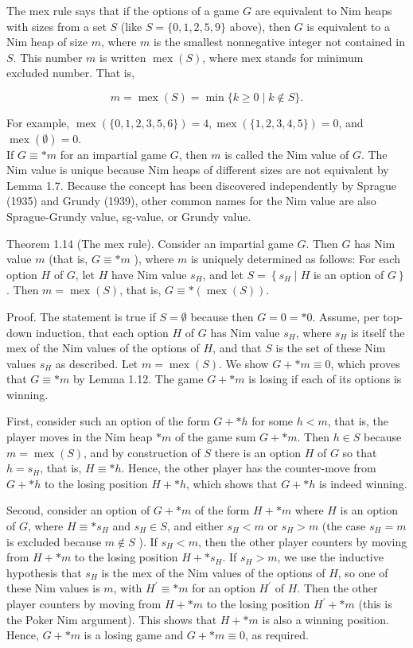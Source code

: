 \documentclass[12pt]{article}
\begin{document}
The mex rule says that if the options of a game $G$ are equivalent to Nim heaps with sizes from a set $S$ (like $S=\{0,1,2,5,9\}$ above), then $G$ is equivalent to a Nim heap of size $m$, where $m$ is the smallest nonnegative integer not contained in $S$. This number $m$ is written $\operatorname{mex}(S)$, where mex stands for minimum excluded number. That is,

$$
m=\operatorname{mex}(S)=\min \{k \geq 0 \mid k \notin S\} .
$$

For example, $\operatorname{mex}(\{0,1,2,3,5,6\})=4, \operatorname{mex}(\{1,2,3,4,5\})=0$, and $\operatorname{mex}(\emptyset)=0$.\\
If $G \equiv * m$ for an impartial game $G$, then $m$ is called the Nim value of $G$. The Nim value is unique because Nim heaps of different sizes are not equivalent by Lemma 1.7. Because the concept has been discovered independently by Sprague (1935) and Grundy (1939), other common names for the Nim value are also Sprague-Grundy value, sg-value, or Grundy value.

Theorem 1.14 (The mex rule). Consider an impartial game $G$. Then $G$ has Nim value $m$ (that is, $G \equiv * m$ ), where $m$ is uniquely determined as follows: For each option $H$ of $G$, let $H$ have Nim value $s_{H}$, and let $S=\left\{s_{H} \mid H\right.$ is an option of $\left.G\right\}$. Then $m=\operatorname{mex}(S)$, that is, $G \equiv *(\operatorname{mex}(S))$.

Proof. The statement is true if $S=\emptyset$ because then $G=0=* 0$. Assume, per top-down induction, that each option $H$ of $G$ has Nim value $s_{H}$, where $s_{H}$ is itself the mex of the Nim values of the options of $H$, and that $S$ is the set of these Nim values $s_{H}$ as described. Let $m=\operatorname{mex}(S)$. We show $G+* m \equiv 0$, which proves that $G \equiv * m$ by Lemma 1.12. The game $G+* m$ is losing if each of its options is winning.

First, consider such an option of the form $G+* h$ for some $h<m$, that is, the player moves in the Nim heap $* m$ of the game sum $G+* m$. Then $h \in S$ because\\
$m=\operatorname{mex}(S)$, and by construction of $S$ there is an option $H$ of $G$ so that $h=s_{H}$, that is, $H \equiv * h$. Hence, the other player has the counter-move from $G+* h$ to the losing position $H+* h$, which shows that $G+* h$ is indeed winning.

Second, consider an option of $G+* m$ of the form $H+* m$ where $H$ is an option of $G$, where $H \equiv * s_{H}$ and $s_{H} \in S$, and either $s_{H}<m$ or $s_{H}>m$ (the case $s_{H}=m$ is excluded because $m \notin S$ ). If $s_{H}<m$, then the other player counters by moving from $H+* m$ to the losing position $H+* s_{H}$. If $s_{H}>m$, we use the inductive hypothesis that $s_{H}$ is the mex of the Nim values of the options of $H$, so one of these Nim values is $m$, with $H^{\prime} \equiv * m$ for an option $H^{\prime}$ of $H$. Then the other player counters by moving from $H+* m$ to the losing position $H^{\prime}+* m$ (this is the Poker Nim argument). This shows that $H+* m$ is also a winning position. Hence, $G+* m$ is a losing game and $G+* m \equiv 0$, as required.
\end{document}
